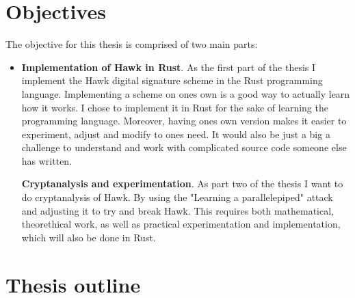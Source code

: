 \section{Objectives}
The objective for this thesis is comprised of two main parts:
\begin{itemize}
\item \textbf{Implementation of Hawk in Rust}. As the first part of the thesis I implement the Hawk digital signature scheme in the Rust programming language. 
    Implementing a scheme on ones own is a good way to actually learn how it works. I chose to implement it in Rust for the sake of learning the programming language.
    Moreover, having ones own version makes it easier to experiment, adjust and modify to ones need. It would also be just a big a challenge to understand and work with complicated source code someone else has written.

    \textbf{Cryptanalysis and experimentation}. As part two of the thesis I want to do cryptanalysis of Hawk. By using the "Learning a parallelepiped" attack \cite{hpp} and adjusting it to try and break Hawk. 
    This requires both mathematical, theorethical work, as well as practical experimentation and implementation, which will also be done in Rust.
\end{itemize}
\section{Thesis outline}
